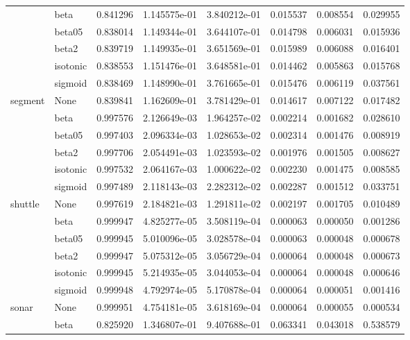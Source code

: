 \begin{tabular}{llrrrrrr}
        & beta &  0.841296 &  1.145575e-01 &  3.840212e-01 &  0.015537 &  0.008554 &  0.029955 \\
        & beta05 &  0.838014 &  1.149344e-01 &  3.644107e-01 &  0.014798 &  0.006031 &  0.015936 \\
        & beta2 &  0.839719 &  1.149935e-01 &  3.651569e-01 &  0.015989 &  0.006088 &  0.016401 \\
        & isotonic &  0.838553 &  1.151476e-01 &  3.648581e-01 &  0.014462 &  0.005863 &  0.015768 \\
        & sigmoid &  0.838469 &  1.148990e-01 &  3.761665e-01 &  0.015476 &  0.006119 &  0.037561 \\
segment & None &  0.839841 &  1.162609e-01 &  3.781429e-01 &  0.014617 &  0.007122 &  0.017482 \\
        & beta &  0.997576 &  2.126649e-03 &  1.964257e-02 &  0.002214 &  0.001682 &  0.028610 \\
        & beta05 &  0.997403 &  2.096334e-03 &  1.028653e-02 &  0.002314 &  0.001476 &  0.008919 \\
        & beta2 &  0.997706 &  2.054491e-03 &  1.023593e-02 &  0.001976 &  0.001505 &  0.008627 \\
        & isotonic &  0.997532 &  2.064167e-03 &  1.000622e-02 &  0.002230 &  0.001475 &  0.008585 \\
        & sigmoid &  0.997489 &  2.118143e-03 &  2.282312e-02 &  0.002287 &  0.001512 &  0.033751 \\
shuttle & None &  0.997619 &  2.184821e-03 &  1.291811e-02 &  0.002197 &  0.001705 &  0.010489 \\
        & beta &  0.999947 &  4.825277e-05 &  3.508119e-04 &  0.000063 &  0.000050 &  0.001286 \\
        & beta05 &  0.999945 &  5.010096e-05 &  3.028578e-04 &  0.000063 &  0.000048 &  0.000678 \\
        & beta2 &  0.999947 &  5.075312e-05 &  3.056729e-04 &  0.000064 &  0.000048 &  0.000673 \\
        & isotonic &  0.999945 &  5.214935e-05 &  3.044053e-04 &  0.000064 &  0.000048 &  0.000646 \\
        & sigmoid &  0.999948 &  4.792974e-05 &  5.170878e-04 &  0.000064 &  0.000051 &  0.001416 \\
sonar & None &  0.999951 &  4.754181e-05 &  3.618169e-04 &  0.000064 &  0.000055 &  0.000534 \\
        & beta &  0.825920 &  1.346807e-01 &  9.407688e-01 &  0.063341 &  0.043018 &  0.538579 \\

\end{tabular}
